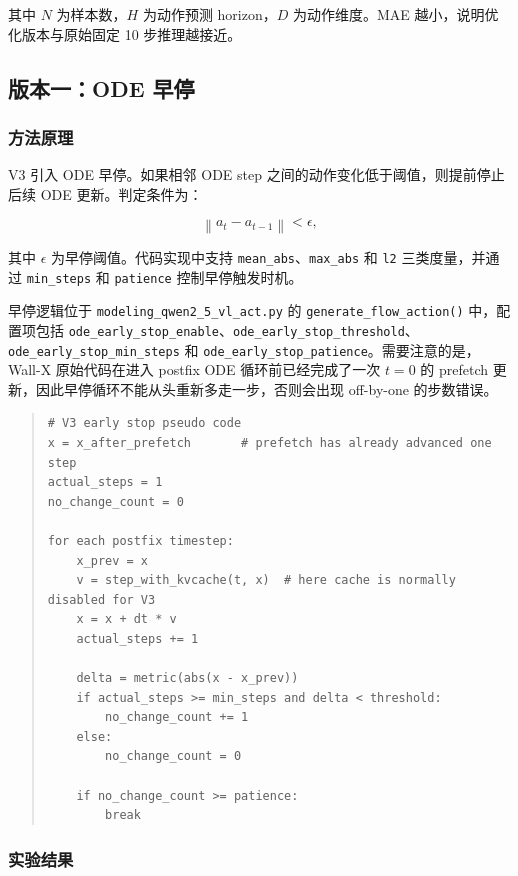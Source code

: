 \documentclass[UTF8,a4paper,12pt]{ctexart}
\begin{document}
其中 \(N\) 为样本数，\(H\) 为动作预测 horizon，\(D\) 为动作维度。MAE 越小，说明优化版本与原始固定 10 步推理越接近。

\subsection{版本一：ODE 早停}

\subsubsection{方法原理}

V3 引入 ODE 早停。如果相邻 ODE step 之间的动作变化低于阈值，则提前停止后续 ODE 更新。判定条件为：

\begin{equation}
\left\|a_t-a_{t-1}\right\| < \epsilon,
\end{equation}

其中 \(\epsilon\) 为早停阈值。代码实现中支持 \texttt{mean\_abs}、\texttt{max\_abs} 和 \texttt{l2} 三类度量，并通过 \texttt{min\_steps} 和 \texttt{patience} 控制早停触发时机。

早停逻辑位于 \texttt{modeling\_qwen2\_5\_vl\_act.py} 的 \texttt{generate\_flow\_action()} 中，配置项包括 \texttt{ode\_early\_stop\_enable}、\texttt{ode\_early\_stop\_threshold}、\texttt{ode\_early\_stop\_min\_steps} 和 \texttt{ode\_early\_stop\_patience}。需要注意的是，Wall-X 原始代码在进入 postfix ODE 循环前已经完成了一次 \(t=0\) 的 prefetch 更新，因此早停循环不能从头重新多走一步，否则会出现 off-by-one 的步数错误。

\begin{quote}\small
\begin{verbatim}
# V3 early stop pseudo code
x = x_after_prefetch       # prefetch has already advanced one step
actual_steps = 1
no_change_count = 0

for each postfix timestep:
    x_prev = x
    v = step_with_kvcache(t, x)  # here cache is normally disabled for V3
    x = x + dt * v
    actual_steps += 1

    delta = metric(abs(x - x_prev))
    if actual_steps >= min_steps and delta < threshold:
        no_change_count += 1
    else:
        no_change_count = 0

    if no_change_count >= patience:
        break
\end{verbatim}
\end{quote}

\subsubsection{实验结果}
\end{document}
